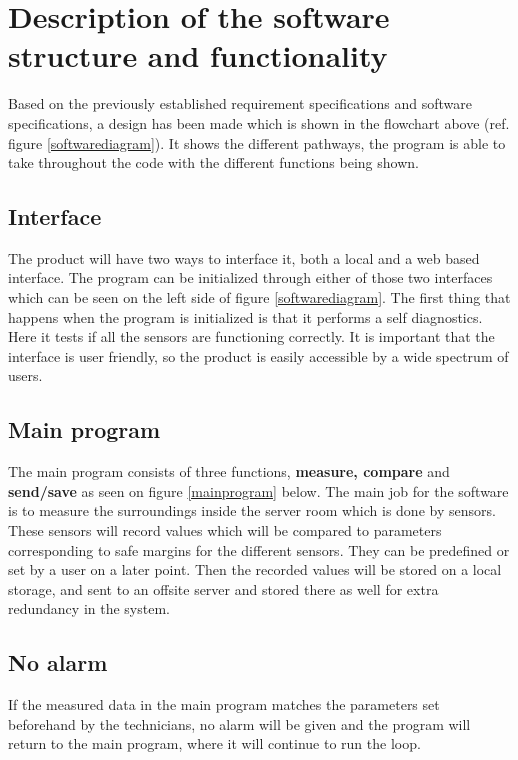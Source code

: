 \section{Description of the software structure and functionality}
Based on the previously established requirement specifications and software specifications, a design has been made which is shown in the flowchart above (ref. figure \ref{softwarediagram}). It shows the different pathways, the program is able to take throughout the code with the different functions being shown.

\subsection{Interface}
The product will have two ways to interface it, both a local and a web based interface. The program can be initialized through either of those two interfaces which can be seen on the left side of figure \ref{softwarediagram}. The first thing that happens when the program is initialized is that it performs a self diagnostics. Here it tests if all the sensors are functioning correctly. It is important that the interface is user friendly, so the product is easily accessible by a wide spectrum of users.

\subsection{Main program}
The main program consists of three functions, \textbf{measure, compare} and \textbf{send/save} as seen on figure \ref{mainprogram} below.
\newline
The main job for the software is to measure the surroundings inside the server room which is done by sensors. These sensors will record values which will be compared to parameters corresponding to safe margins for the different sensors. They can be predefined or set by a user on a later point. Then the recorded values will be stored on a local storage, and sent to an offsite server and stored there as well for extra redundancy in the system.

\subsection{No alarm}
If the measured data in the main program matches the parameters set beforehand by the technicians, no alarm will be given and the program will return to the main program, where it will continue to run the loop.
\newline

